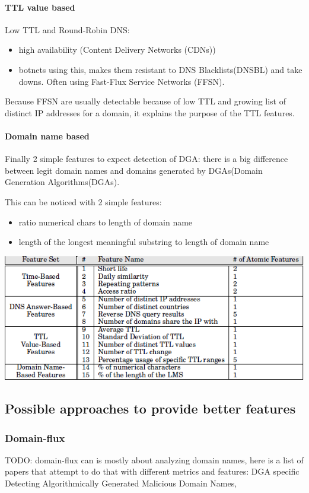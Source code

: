 \paragraph{TTL value based}
Low TTL and Round-Robin DNS: \\
\begin{itemize}
\item high availability (Content Delivery Networks (CDNs))
\item botnets using this, makes them resistant to DNS Blacklists(DNSBL) and take downs. Often using Fast-Flux Service Networks (FFSN).
\end{itemize}
Because FFSN are usually detectable because of low TTL and growing list of distinct IP addresses for a domain, it explains the purpose of the TTL features.
\paragraph{Domain name based}
Finally 2 simple features to expect detection of DGA: there is a big difference between legit domain names and domains generated by DGAs(Domain Generation Algorithms(DGAs).

This can be noticed with 2 simple features:\\
\begin{itemize}
\item ratio numerical chars to length of domain name
\item length of the longest meaningful substring to length of domain name
\end{itemize}
\includegraphics[scale=.3]{img/exposure_features.png}

\subsection{Possible approaches to provide better features}
\subsubsection{Domain-flux}
TODO: domain-flux can is mostly about analyzing domain names, here is a list of papers that attempt to do that with different metrics and features:  
DGA specific\\
Detecting Algorithmically Generated Malicious Domain Names, %


